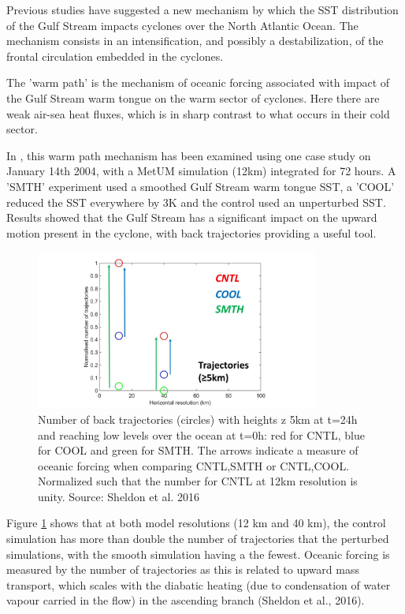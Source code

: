 Previous studies \cite{vanniere2017cold} \cite{sheldon2017warm} have suggested a new mechanism by which the SST distribution of the Gulf Stream impacts cyclones over the North Atlantic Ocean. The mechanism consists in an intensification, and possibly a destabilization, of the frontal circulation embedded in the cyclones. 

The 'warm path' is the mechanism of oceanic forcing  associated with impact of the Gulf Stream warm tongue on the warm sector of cyclones. Here there are weak air-sea heat fluxes, which is in sharp contrast to what occurs in their cold sector.

In \cite{sheldon2017warm} , this warm path mechanism has been examined using one case study on January 14th 2004, with a MetUM simulation (12km) integrated for 72 hours. A 'SMTH' experiment used a smoothed Gulf Stream warm tongue SST, a 'COOL' reduced the SST everywhere by 3K and the control used an unperturbed SST. Results showed that the Gulf Stream has a significant impact on the upward motion present in the cyclone, with back trajectories providing a useful tool. 

\begin{figure}
	
	\includegraphics[width=22pc,angle=0]{warmpath_result.png} %
	\caption{Number of back trajectories (circles) with heights z 5km at t=24h and reaching low levels over the ocean at t=0h: red for CNTL, blue for COOL and green for SMTH. The arrows indicate a measure of oceanic forcing when comparing CNTL,SMTH or CNTL,COOL. Normalized such that the number for CNTL at 12km resolution is unity. Source: Sheldon et al. 2016}\label{fig:wp_result}
	\centering
\end{figure}

Figure \ref{fig:wp_result} shows that at both model resolutions (12 km and 40 km), the control simulation has more than double the number of trajectories that the perturbed simulations, with the smooth simulation having a the fewest. Oceanic forcing is measured by the number of trajectories as this is related to upward mass transport, which scales with the diabatic heating (due to condensation of water vapour carried in the flow) in the ascending branch (Sheldon et al., 2016).

